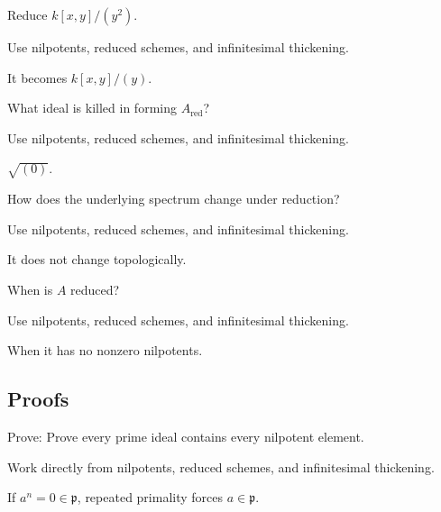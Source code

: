 \begin{exercise}\label{exr:vi10-expand-02}
Reduce $k[x,y]/(y^2)$.
\end{exercise}
\begin{hint}
Use nilpotents, reduced schemes, and infinitesimal thickening.
\end{hint}
\begin{solution}
It becomes $k[x,y]/(y)$.
\end{solution}

\begin{exercise}[Nilradical]\label{exr:vi10-expand-03}
What ideal is killed in forming $A_{\mathrm{red}}$?
\end{exercise}
\begin{hint}
Use nilpotents, reduced schemes, and infinitesimal thickening.
\end{hint}
\begin{solution}
$\sqrt{(0)}$.
\end{solution}

\begin{exercise}[Spectrum]\label{exr:vi10-expand-04}
How does the underlying spectrum change under reduction?
\end{exercise}
\begin{hint}
Use nilpotents, reduced schemes, and infinitesimal thickening.
\end{hint}
\begin{solution}
It does not change topologically.
\end{solution}

\begin{exercise}\label{exr:vi10-expand-05}
When is $A$ reduced?
\end{exercise}
\begin{hint}
Use nilpotents, reduced schemes, and infinitesimal thickening.
\end{hint}
\begin{solution}
When it has no nonzero nilpotents.
\end{solution}

\subsection*{Proofs}

\begin{exercise}\label{exr:vi10-expand-06}
Prove: Prove every prime ideal contains every nilpotent element.
\end{exercise}
\begin{hint}
Work directly from nilpotents, reduced schemes, and infinitesimal thickening.
\end{hint}
\begin{solution}
If $a^n=0\in\mathfrak p$, repeated primality forces $a\in\mathfrak p$.
\end{solution}

